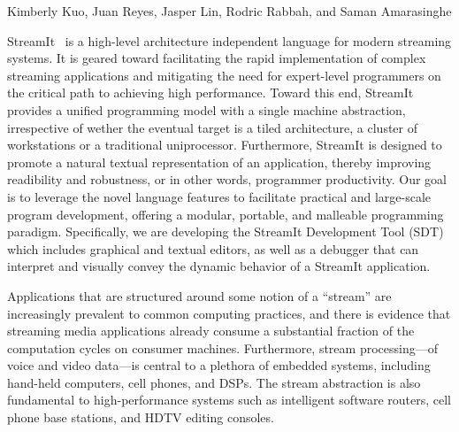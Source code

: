 \documentclass{csailabstractbook}
\begin{document}


         {Kimberly Kuo, Juan Reyes, Jasper Lin, Rodric Rabbah, and Saman Amarasinghe}



StreamIt~\cite{streamitcc}  is a  high-level  architecture independent
language  for   modern  streaming   systems.   It  is   geared  toward
facilitating   the   rapid   implementation   of   complex   streaming
applications and  mitigating the need for  expert-level programmers on
the  critical path to  achieving high  performance.  Toward  this end,
StreamIt provides  a unified programming  model with a  single machine
abstraction,  irrespective of wether  the eventual  target is  a tiled
architecture, a cluster of workstations or a traditional uniprocessor.
Furthermore,  StreamIt  is  designed  to  promote  a  natural  textual
representation  of an application,  thereby improving  readibility and
robustness, or  in other words, programmer productivity.   Our goal is
to leverage  the novel language  features to facilitate  practical and
large-scale  program development,  offering a  modular,  portable, and
malleable programming  paradigm.  Specifically, we  are developing the
StreamIt Development  Tool (SDT) which includes  graphical and textual
editors, as well as a  debugger that can interpret and visually convey
the dynamic behavior of a StreamIt application.


Applications that  are structured around  some notion of  a ``stream''
are increasingly prevalent to common computing practices, and there is
evidence   that  streaming  media   applications  already   consume  a
substantial fraction  of the computation cycles  on consumer machines.
Furthermore, stream processing---of  voice and video data---is central
to a plethora of embedded systems, including hand-held computers, cell
phones,  and  DSPs. The  stream  abstraction  is  also fundamental  to
high-performance  systems such as  intelligent software  routers, cell
phone base stations, and HDTV editing consoles.
\end{document}
